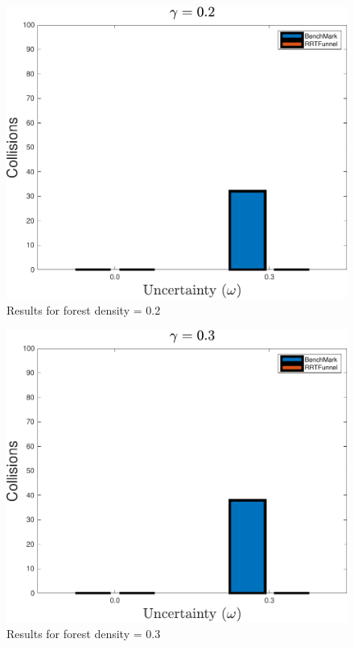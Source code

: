 \begin{figure}
  \centering
    \includegraphics[width=\textwidth]{figures/experiments/ResultPlot02}
  \caption{Results for forest density = 0.2}
  \label{fig:result0.2}
\end{figure}

\begin{figure}
  \centering
    \includegraphics[width=\textwidth]{figures/experiments/ResultPlot03}
  \caption{Results for forest density = 0.3}
  \label{fig:result0.2}
\end{figure}


